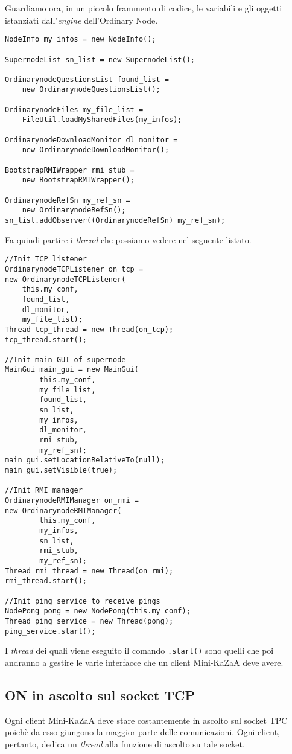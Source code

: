 Guardiamo ora, in un piccolo frammento di codice, le variabili e gli oggetti istanziati dall'\emph{engine} dell'Ordinary Node.
\begin{lstlisting}
NodeInfo my_infos = new NodeInfo();

SupernodeList sn_list = new SupernodeList();

OrdinarynodeQuestionsList found_list = 
	new OrdinarynodeQuestionsList();
	
OrdinarynodeFiles my_file_list = 
	FileUtil.loadMySharedFiles(my_infos);
	
OrdinarynodeDownloadMonitor dl_monitor = 
	new OrdinarynodeDownloadMonitor();

BootstrapRMIWrapper rmi_stub = 
	new BootstrapRMIWrapper();
	
OrdinarynodeRefSn my_ref_sn = 
	new OrdinarynodeRefSn();
sn_list.addObserver((OrdinarynodeRefSn) my_ref_sn);

\end{lstlisting}

Fa quindi partire i \emph{thread} che possiamo vedere nel seguente listato.

\begin{lstlisting}
//Init TCP listener
OrdinarynodeTCPListener on_tcp = 
new OrdinarynodeTCPListener(
	this.my_conf, 
	found_list, 
	dl_monitor, 
	my_file_list);
Thread tcp_thread = new Thread(on_tcp);
tcp_thread.start();

//Init main GUI of supernode
MainGui main_gui = new MainGui(
		this.my_conf,
		my_file_list,
		found_list,
		sn_list,
		my_infos,
		dl_monitor,
		rmi_stub,
		my_ref_sn);
main_gui.setLocationRelativeTo(null);
main_gui.setVisible(true);

//Init RMI manager
OrdinarynodeRMIManager on_rmi = 
new OrdinarynodeRMIManager(
		this.my_conf,
		my_infos,
		sn_list,
		rmi_stub,
		my_ref_sn);
Thread rmi_thread = new Thread(on_rmi);
rmi_thread.start();

//Init ping service to receive pings
NodePong pong = new NodePong(this.my_conf);
Thread ping_service = new Thread(pong);
ping_service.start();
\end{lstlisting}
I \emph{thread} dei quali viene eseguito il comando \verb|.start()| sono quelli che poi andranno a gestire le varie interfacce che un client Mini-KaZaA deve avere.

\subsection{ON in ascolto sul socket TCP}
Ogni client Mini-KaZaA deve stare costantemente in ascolto sul socket TPC poichè da esso giungono la maggior parte delle comunicazioni.
Ogni client, pertanto, dedica un \emph{thread} alla funzione di ascolto su tale socket.

